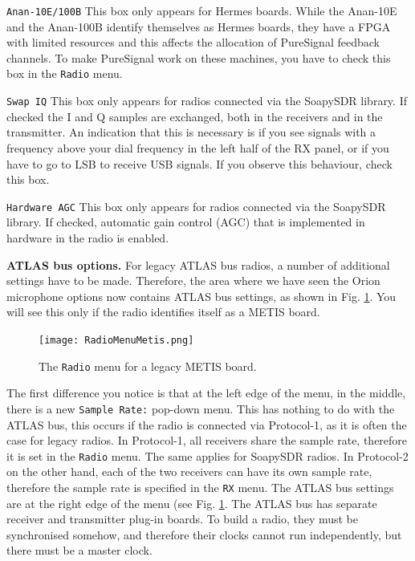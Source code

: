 \documentclass[12pt]{book}
\def\rett#1{\texttt{\color{red}#1}}
\def\bltt#1{\texttt{\color{blue}#1}}
\begin{document}
\rett{Anan-10E/100B} This box only appears for Hermes boards. While the Anan-10E and
the Anan-100B identify themselves as Hermes boards, they have a FPGA with limited
resources and this affects the allocation of PureSignal feedback channels. To make
PureSignal work on these machines, you have to check this box in the \bltt{Radio} menu.

\rett{Swap IQ} This box only appears for radios connected via the SoapySDR library. If checked
the I and Q samples are exchanged, both in the receivers and in the transmitter. An indication
that this is necessary is if you see signals with a frequency above your dial frequency in
the left half of the RX panel, or if you have to go to LSB to receive USB signals. If you
observe this behaviour, check this box.

\rett{Hardware AGC} This box only appears for radios connected via the SoapySDR library.
If checked, automatic gain control (AGC) that is implemented in hardware in the radio is enabled.

\textbf{ATLAS bus options.} For legacy ATLAS bus radios, a number of additional settings have to be
made. Therefore, the area where we have seen the Orion microphone options now contains ATLAS bus
settings, as shown in Fig. \ref{fig:RadioMenuMetis}. You will see this only if the radio identifies
itself as a METIS board.

\begin{figure}[ht]
\center
\texttt{[image: RadioMenuMetis.png]}
\caption{The \bltt{Radio} menu for a legacy METIS board.}
\label{fig:RadioMenuMetis}
\end{figure}

The first difference you notice is that at the left edge of the menu, in the middle,
there is a new \rett{Sample Rate:} pop-down menu. This has nothing to do with the
ATLAS bus, this occurs if the radio is connected via Protocol-1, as it is often the case for
legacy radios. In Protocol-1, all receivers share the sample rate, therefore it is set in the
\bltt{Radio} menu. The same applies for SoapySDR radios. In Protocol-2 on the other hand, each
of the two receivers can have its own sample rate, therefore the sample rate is specified
in the \bltt{RX} menu. The ATLAS bus settings are at the right edge of the menu (see Fig.
\ref{fig:RadioMenuMetis}. The ATLAS bus has separate receiver and transmitter plug-in boards.
To build a radio, they must be synchronised somehow, and therefore their clocks cannot run
independently, but there must be a master clock.
\end{document}
